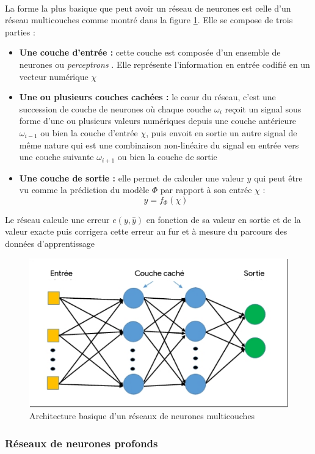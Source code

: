 		\paragraph{}
		La forme la plus basique que peut avoir un réseau de neurones est celle d'un réseau multicouches comme montré dans la figure \ref{mlp}. Elle se compose de trois parties :
		\begin{itemize}
			\item \textbf{Une couche d'entrée : } cette couche est composée d'un ensemble de neurones ou \textit{perceptrons} \cite{perceptron}. Elle représente l'information en entrée codifié en un vecteur numérique $\chi$
			
			\item  \textbf{Une ou plusieurs couches cachées :} le cœur du réseau, c'est une succession de couche de neurones où chaque couche $\omega_i$ reçoit un signal sous forme d'une ou plusieurs valeurs numériques depuis une couche antérieure $\omega_{i-1}$ ou bien la couche d'entrée $\chi$, puis envoit en sortie un autre signal de même nature qui est une combinaison non-linéaire du signal en entrée vers une couche suivante $\omega_{i+1}$ ou bien la couche de sortie
			\item \textbf{Une couche de sortie :}
			elle permet de calculer une valeur $y$ qui peut être vu comme la prédiction du modèle $\Phi$ par rapport à son entrée $\chi$ : 
			\begin{equation}
				y = f_\Phi(\chi)
			\end{equation}
		\end{itemize}
		Le réseau calcule une erreur $e(y,\hat{y})$ en fonction de sa valeur en sortie et de la valeur exacte puis corrigera cette erreur au fur et à mesure du parcours des données d'apprentissage \cite{mlp}
			\begin{figure}[H]
			\centering
			\includegraphics[width=0.5\linewidth]{images/notions/mlp.png}
			\caption{Architecture basique d'un réseaux de neurones multicouches}
			\label{mlp}
		\end{figure}
	
		\subsubsection{Réseaux de neurones profonds}\label{part2DNN}
